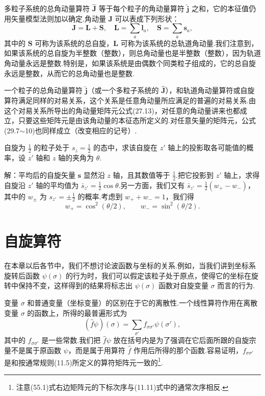 多粒子系统的总角动量算符 $\hat{\boldsymbol{J}}$ 等于每个粒子的角动量算符 $\hat{\boldsymbol{j}}$ 之和，它的本征值仍用矢量模型法则加以确定.角动量 $\boldsymbol{J}$ 可以表成下列形状：
\begin{equation}
  \boldsymbol{J}=\boldsymbol{L}+\boldsymbol{S},\quad
  \boldsymbol{L}=\sum_a\boldsymbol{l}_a,\quad
  \boldsymbol{S}=\sum_a\boldsymbol{s}_a,
\end{equation}
其中的 $\boldsymbol{S}$ 可称为该系统的总自旋，$\boldsymbol{L}$ 可称为该系统的总轨道角动量.我们注意到，如果该系统的总自旋为半整数（整数），则总角动量也是半整数（整数），因为轨道角动量永远是整数.特别是，如果该系统是由偶数个同类粒子组成的，它的总自旋永远是整数，从而它的总角动量也是整数.

一个粒子的总角动量算符 $\hat{\boldsymbol{j}}$（或一个多粒子系统的 $\hat{\boldsymbol{J}}$），和轨道角动量算符或自旋算符满足同样的对易关系，这个关系是任意角动量所应满足的普遍的对易关系.由这个对易关系所导出的角动量矩阵元公式(27.13)，对任意的角动量讲来也都成立，只要这些矩阵元是由该角动量的本征态所定义的.对任意矢量的矩阵元，公式(29.7$\sim$10)也同样成立（改变相应的记号）.

\begin{xiti}

\quad 自旋为 $\frac{1}{2}$ 的粒子处于 $s_z=\frac{1}{2}$ 的态中，求该自旋在 $z'$ 轴上的投影取各可能值的概率，设 $z'$ 轴和 $z$ 轴的夹角为 $\theta$.

解：平均后的自旋矢量 $\boldsymbol{s}$ 显然沿 $z$ 轴，且其数值等于 $\frac{1}{2}$.把它投影到 $z'$ 轴上，求得自旋沿 $z'$ 轴的平均值为 $\bar{s}_{z'}=\frac{1}{2}\cos\theta$.另一方面，我们又有 $\bar{s}_{z'}=\frac{1}{2}(w_+-w_-)$，其中的 $w_\pm$ 为 $s_{z'}=\pm\frac{1}{2}$ 的概率.考虑到 $w_++w_-=1$，我们得
\begin{equation*}
  w_+=\cos^2(\theta/2),\qquad w_-=\sin^2(\theta/2).
\end{equation*}

\end{xiti}

\section{自旋算符}

在本章以后各节中，我们不想讨论波函数与坐标的关系.例如，当我们讲到坐标系旋转后函数 $\psi(\sigma)$ 的行为时，我们可以假定该粒子处于原点，使得它的坐标在旋转中保持不变，这样得到的结果将标志出 $\psi(\sigma)$ 函数对自旋变量 $\sigma$ 而言的行为.

变量 $\sigma$ 和普通变量（坐标变量）的区别在于它的离散性.一个线性算符作用在离散变量 $\sigma$ 的函数上，所得的最普遍形式为
\begin{equation}
  (\hat{f}\psi)(\sigma)=\sum_{\sigma'}f_{\sigma\sigma'}\psi(\sigma'),
\end{equation}
其中的 $f_{\sigma\sigma'}$ 是一些常数.我们把 $\hat{f}\psi$ 放在括号内是为了强调在它后面所跟的自旋宗量不是属于原函数 $\psi$，而是属于用算符 $\hat{f}$ 作用后所得的那个函数.容易证明，$f_{\sigma\sigma'}$ 是和按通常规则(11.5)所定义的算符矩阵元一致的\footnote{注意(55.1)式右边矩阵元的下标次序与(11.11)式中的通常次序相反.}.

